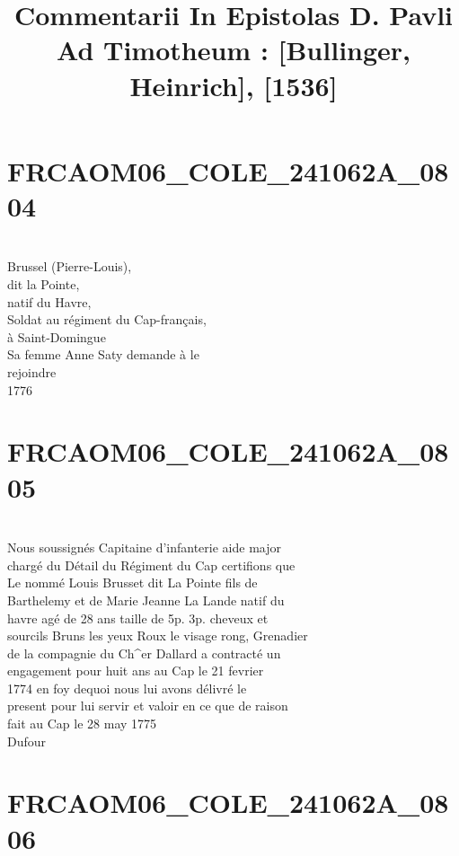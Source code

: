 \documentclass{article}
\begin{document}
\date{}
\title{Commentarii In Epistolas D. Pavli Ad Timotheum : [Bullinger, Heinrich], [1536]}
\maketitle
\tableofcontents
\clearpage
\begin{pages} 
\beginnumbering

\endnumbering\beginnumbering\section{FRCAOM06\_COLE\_241062A\_0804}\pstart
\\
Brussel (Pierre-Louis),\\
dit la Pointe,\\
natif du Havre,\\
Soldat au régiment du Cap-français,\\
à Saint-Domingue\\
Sa femme Anne Saty demande à le\\
rejoindre\\
1776
\pend
\endnumbering\beginnumbering\section{FRCAOM06\_COLE\_241062A\_0805}\pstart
\\
Nous soussignés Capitaine d'infanterie aide major\\
chargé du Détail du Régiment du Cap certifions que\\
Le nommé Louis Brusset dit La Pointe fils de\\
Barthelemy et de Marie Jeanne La Lande natif du\\
havre agé de 28 ans taille de 5p. 3p. cheveux et\\
sourcils Bruns les yeux Roux le visage rong, Grenadier\\
de la compagnie du Ch\^{}er Dallard a contracté un\\
engagement pour huit ans au Cap le 21 fevrier\\
1774 en foy dequoi nous lui avons délivré le\\
present pour lui servir et valoir en ce que de raison\\
fait au Cap le 28 may 1775\\
Dufour
\pend
\endnumbering\beginnumbering\section{FRCAOM06\_COLE\_241062A\_0806}

\end{pages}
\end{document}
